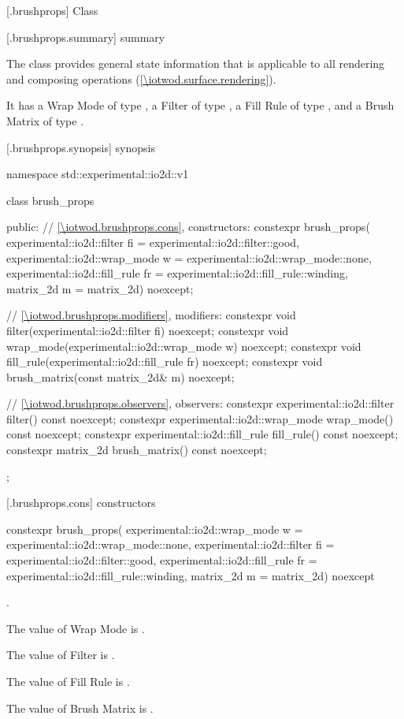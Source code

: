 
 [\iotwod.brushprops] {Class }

 [\iotwod.brushprops.summary] { summary}

\pnum
{}%
The  class provides general state information that is applicable to all rendering and composing operations (\ref{\iotwod.surface.rendering}).

\pnum
It has a Wrap Mode of type , a Filter of type , a Fill Rule of type , and a Brush Matrix of type .

 [\iotwod.brushprops.synopsis] { synopsis}

\begin{codeblock}
namespace std::experimental::io2d::v1 {
  class brush_props {
  public:
    // \ref{\iotwod.brushprops.cons}, constructors:
    constexpr brush_props(
      experimental::io2d::filter fi = experimental::io2d::filter::good,
      experimental::io2d::wrap_mode w = experimental::io2d::wrap_mode::none,
      experimental::io2d::fill_rule fr = experimental::io2d::fill_rule::winding,
      matrix_2d m = matrix_2d{}) noexcept;

    // \ref{\iotwod.brushprops.modifiers}, modifiers:
    constexpr void filter(experimental::io2d::filter fi) noexcept;
    constexpr void wrap_mode(experimental::io2d::wrap_mode w) noexcept;
    constexpr void fill_rule(experimental::io2d::fill_rule fr) noexcept;
    constexpr void brush_matrix(const matrix_2d& m) noexcept;

    // \ref{\iotwod.brushprops.observers}, observers:
    constexpr experimental::io2d::filter filter() const noexcept;
    constexpr experimental::io2d::wrap_mode wrap_mode() const noexcept;
    constexpr experimental::io2d::fill_rule fill_rule() const noexcept;
    constexpr matrix_2d brush_matrix() const noexcept;
  };
}
\end{codeblock}

 [\iotwod.brushprops.cons] { constructors}

\begin{itemdecl}
constexpr brush_props(
  experimental::io2d::wrap_mode w = experimental::io2d::wrap_mode::none,
  experimental::io2d::filter fi = experimental::io2d::filter::good,
  experimental::io2d::fill_rule fr = experimental::io2d::fill_rule::winding,
  matrix_2d m = matrix_2d{}) noexcept    
\end{itemdecl}
\begin{itemdescr}
\onecolumn
\requires
{}.

\pnum
\effects
The value of Wrap Mode is .

\pnum
The value of Filter is .

\pnum
The value of Fill Rule is .

\pnum
The value of Brush Matrix is .
\end{itemdescr}

